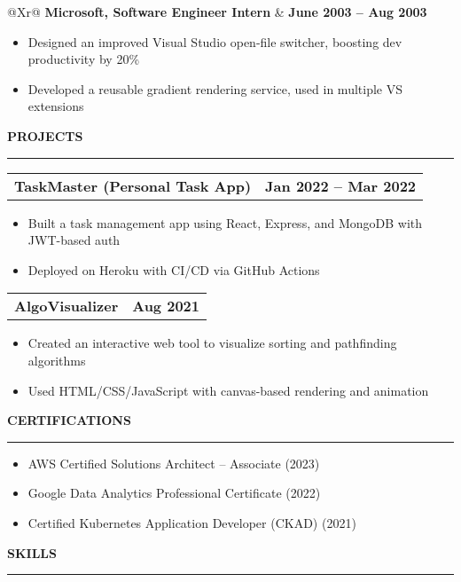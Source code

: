\documentclass[10pt, letterpaper]{article}
\newcommand{\sectiontitle}[1]{
  \vspace{0.5cm}
  {\Large\color{primary}\textbf{#1}}
  \vspace{0.2cm}\hrule
  \vspace{0.3cm}
}
\begin{document}
\begin{tabularx}{\textwidth}{@{}Xr@{}}
  \textbf{Microsoft, Software Engineer Intern} & \textbf{June 2003 -- Aug 2003} \\
\end{tabularx}
\begin{itemize}[leftmargin=*, nosep]
  \item Designed an improved Visual Studio open-file switcher, boosting dev productivity by 20\%
  \item Developed a reusable gradient rendering service, used in multiple VS extensions
\end{itemize}

\sectiontitle{PROJECTS}

\begin{tabularx}{\textwidth}{@{}Xr@{}}
  \textbf{TaskMaster (Personal Task App)} & \textbf{Jan 2022 -- Mar 2022}
\end{tabularx}
\begin{itemize}[leftmargin=*, nosep]
  \item Built a task management app using React, Express, and MongoDB with JWT-based auth
  \item Deployed on Heroku with CI/CD via GitHub Actions
\end{itemize}

\begin{tabularx}{\textwidth}{@{}Xr@{}}
  \textbf{AlgoVisualizer} & \textbf{Aug 2021}
\end{tabularx}
\begin{itemize}[leftmargin=*, nosep]
  \item Created an interactive web tool to visualize sorting and pathfinding algorithms
  \item Used HTML/CSS/JavaScript with canvas-based rendering and animation
\end{itemize}

\sectiontitle{CERTIFICATIONS}

\begin{itemize}[leftmargin=*, nosep]
  \item AWS Certified Solutions Architect – Associate (2023)
  \item Google Data Analytics Professional Certificate (2022)
  \item Certified Kubernetes Application Developer (CKAD) (2021)
\end{itemize}

\sectiontitle{SKILLS}
\end{document}
